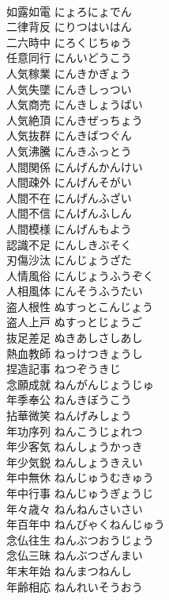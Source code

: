 \documentclass[8pt]{extreport}
\begin{document}
\begin{CJK}{UTF8}{min}
\\	如露如電	にょろにょでん	
\\	二律背反	にりつはいはん	
\\	二六時中	にろくじちゅう	
\\	任意同行	にんいどうこう	
\\	人気稼業	にんきかぎょう	
\\	人気失墜	にんきしっつい	
\\	人気商売	にんきしょうばい	
\\	人気絶頂	にんきぜっちょう	
\\	人気抜群	にんきばつぐん	
\\	人気沸騰	にんきふっとう	
\\	人間関係	にんげんかんけい	
\\	人間疎外	にんげんそがい	
\\	人間不在	にんげんふざい	
\\	人間不信	にんげんふしん	
\\	人間模様	にんげんもよう	
\\	認識不足	にんしきぶそく	
\\	刃傷沙汰	にんじょうざた	
\\	人情風俗	にんじょうふうぞく	
\\	人相風体	にんそうふうたい	
\\	盗人根性	ぬすっとこんじょう	
\\	盗人上戸	ぬすっとじょうご	
\\	抜足差足	ぬきあしさしあし	
\\	熱血教師	ねっけつきょうし	
\\	捏造記事	ねつぞうきじ	
\\	念願成就	ねんがんじょうじゅ	
\\	年季奉公	ねんきぼうこう	
\\	拈華微笑	ねんげみしょう	
\\	年功序列	ねんこうじょれつ	
\\	年少客気	ねんしょうかっき	
\\	年少気鋭	ねんしょうきえい	
\\	年中無休	ねんじゅうむきゅう	
\\	年中行事	ねんじゅうぎょうじ	
\\	年々歳々	ねんねんさいさい	
\\	年百年中	ねんびゃくねんじゅう	
\\	念仏往生	ねんぶつおうじょう	
\\	念仏三昧	ねんぶつざんまい	
\\	年末年始	ねんまつねんし	
\\	年齢相応	ねんれいそうおう	

\end{CJK}
\end{document}

